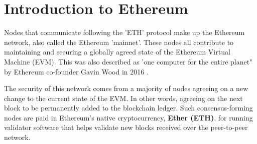 
\section{Introduction to Ethereum}


Nodes that communicate following the 'ETH' protocol make up the Ethereum network, also called the Ethereum 'mainnet'. These nodes all contribute to maintaining and securing a globally agreed state of the Ethereum Virtual Machine (EVM). This was also described as 'one computer for the entire planet" by Ethereum co-founder Gavin Wood in 2016 \cite{Ethereum:Industries}. 

The security of this network comes from a majority of nodes agreeing on a new change to the current state of the EVM. In other words, agreeing on the next block to be permanently added to the blockchain ledger. Such consensus-forming nodes are paid in Ethereum's native cryptocurrency, \textbf{Ether (ETH)}, for running validator software that helps validate new blocks received over the peer-to-peer network.


